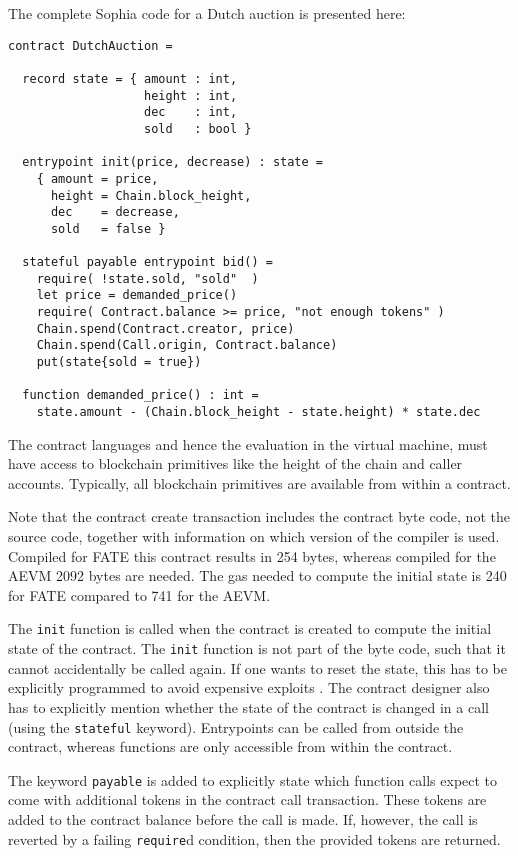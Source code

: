 The complete Sophia code for a Dutch auction is presented here:

\begin{verbatim}
contract DutchAuction =

  record state = { amount : int,
                   height : int,
                   dec    : int,
                   sold   : bool }

  entrypoint init(price, decrease) : state =
    { amount = price,
      height = Chain.block_height,
      dec    = decrease,
      sold   = false }

  stateful payable entrypoint bid() =
    require( !state.sold, "sold"  )
    let price = demanded_price()
    require( Contract.balance >= price, "not enough tokens" )
    Chain.spend(Contract.creator, price)
    Chain.spend(Call.origin, Contract.balance)
    put(state{sold = true})

  function demanded_price() : int =
    state.amount - (Chain.block_height - state.height) * state.dec

\end{verbatim}

The contract languages and hence the evaluation in the virtual
machine, must have access to blockchain primitives like the height of
the chain and caller accounts. Typically, all blockchain
primitives are available from within a contract.

Note that the contract create transaction includes the contract
byte code, not the source code, together with information on
which version of the compiler is used. Compiled for FATE this contract
results in 254 bytes, whereas compiled for the AEVM 2092 bytes are
needed. The gas needed to compute the initial state is 240 for FATE compared
to 741 for the AEVM.

The \texttt{init} function is called when the contract is created to
compute the initial state of the contract. The \texttt{init} function
is not part of the byte code, such that it cannot accidentally be
called again. If one wants to reset the state, this has to be
explicitly programmed to avoid expensive exploits
\cite{suiche2017280}.
The contract designer also has to explicitly mention whether the
state of the contract is changed in a call (using the
\texttt{stateful} keyword).
Entrypoints can be called from outside the contract, whereas functions
are only accessible from within the contract.

The keyword \texttt{payable} is added to explicitly state which
function calls expect to come with additional tokens in the contract
call transaction. These tokens are added to the contract balance
before the call is made. If, however, the call is reverted by a failing
\texttt{require}d condition, then the provided tokens are returned.


